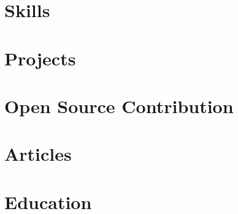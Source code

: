 \documentclass[letter, 11pt]{article}
\begin{document}


\section{Skills}


\section{Projects}


\section{Open Source Contribution}


\section{Articles}


\section{Education}
% 
\end{document}
